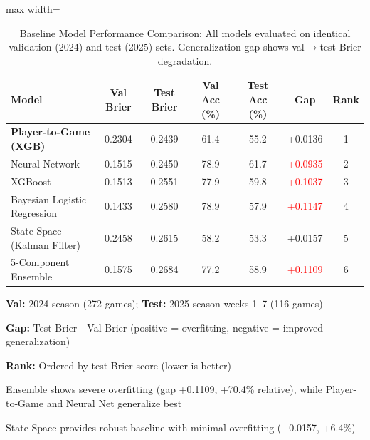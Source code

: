 \begin{table}[!ht]
\centering
\caption[Baseline Model Comparison]{Baseline Model Performance Comparison: All models evaluated on identical validation (2024) and test (2025) sets. Generalization gap shows val$\to$test Brier degradation.}
\label{tab:baseline-comparison}
\begin{adjustbox}{max width=\textwidth}
\begin{tabular}{@{}lcccccc@{}}
\toprule
\textbf{Model} & \textbf{Val Brier} & \textbf{Test Brier} & \textbf{Val Acc (\%)} & \textbf{Test Acc (\%)} & \textbf{Gap} & \textbf{Rank} \\
\midrule
\textbf{Player-to-Game (XGB)} & 0.2304 & 0.2439 & 61.4 & 55.2 & +0.0136 & 1 \\
Neural Network & 0.1515 & 0.2450 & 78.9 & 61.7 & \textcolor{red}{+0.0935} & 2 \\
XGBoost & 0.1513 & 0.2551 & 77.9 & 59.8 & \textcolor{red}{+0.1037} & 3 \\
Bayesian Logistic Regression & 0.1433 & 0.2580 & 78.9 & 57.9 & \textcolor{red}{+0.1147} & 4 \\
State-Space (Kalman Filter) & 0.2458 & 0.2615 & 58.2 & 53.3 & +0.0157 & 5 \\
5-Component Ensemble & 0.1575 & 0.2684 & 77.2 & 58.9 & \textcolor{red}{+0.1109} & 6 \\
\bottomrule
\end{tabular}
\end{adjustbox}
\begin{tablenotes}[flushleft]\footnotesize
\item \textbf{Val:} 2024 season (272 games); \textbf{Test:} 2025 season weeks 1--7 (116 games)
\item \textbf{Gap:} Test Brier - Val Brier (positive = overfitting, negative = improved generalization)
\item \textbf{Rank:} Ordered by test Brier score (lower is better)
\item Ensemble shows severe overfitting (gap +0.1109, +70.4\% relative), while Player-to-Game and Neural Net generalize best
\item State-Space provides robust baseline with minimal overfitting (+0.0157, +6.4\%)
\end{tablenotes}
\end{table}
